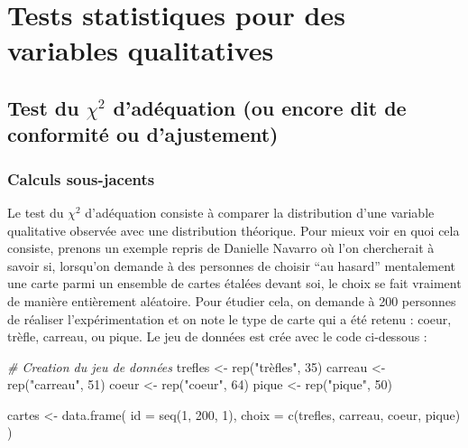 \documentclass[
]{book}
\newenvironment{Shaded}{\begin{snugshade}}{\end{snugshade}}
\newcommand{\AttributeTok}[1]{\textcolor[rgb]{0.77,0.63,0.00}{#1}}
\newcommand{\CommentTok}[1]{\textcolor[rgb]{0.56,0.35,0.01}{\textit{#1}}}
\newcommand{\DecValTok}[1]{\textcolor[rgb]{0.00,0.00,0.81}{#1}}
\newcommand{\FunctionTok}[1]{\textcolor[rgb]{0.00,0.00,0.00}{#1}}
\newcommand{\NormalTok}[1]{#1}
\newcommand{\OtherTok}[1]{\textcolor[rgb]{0.56,0.35,0.01}{#1}}
\newcommand{\StringTok}[1]{\textcolor[rgb]{0.31,0.60,0.02}{#1}}
\begin{document}
\hypertarget{tests-statistiques-pour-des-variables-qualitatives}{%
\chapter{Tests statistiques pour des variables qualitatives}\label{tests-statistiques-pour-des-variables-qualitatives}}

\hypertarget{test-du-chi2-daduxe9quation-ou-encore-dit-de-conformituxe9-ou-dajustement}{%
\section{\texorpdfstring{Test du \(\chi^2\) d'adéquation (ou encore dit de conformité ou d'ajustement)}{Test du \textbackslash chi\^{}2 d'adéquation (ou encore dit de conformité ou d'ajustement)}}\label{test-du-chi2-daduxe9quation-ou-encore-dit-de-conformituxe9-ou-dajustement}}

\hypertarget{calculs-sous-jacents}{%
\subsection{Calculs sous-jacents}\label{calculs-sous-jacents}}

Le test du \(\chi^2\) d'adéquation consiste à comparer la distribution d'une variable qualitative observée avec une distribution théorique. Pour mieux voir en quoi cela consiste, prenons un exemple repris de Danielle Navarro \autocite*{navarroLearningStatistics2018} où l'on chercherait à savoir si, lorsqu'on demande à des personnes de choisir ``au hasard'' mentalement une carte parmi un ensemble de cartes étalées devant soi, le choix se fait vraiment de manière entièrement aléatoire. Pour étudier cela, on demande à 200 personnes de réaliser l'expérimentation et on note le type de carte qui a été retenu : coeur, trèfle, carreau, ou pique. Le jeu de données est crée avec le code ci-dessous :

\begin{Shaded}
\begin{Highlighting}[]
\CommentTok{\# Creation du jeu de données}
\NormalTok{trefles }\OtherTok{\textless{}{-}} \FunctionTok{rep}\NormalTok{(}\StringTok{"trèfles"}\NormalTok{, }\DecValTok{35}\NormalTok{)}
\NormalTok{carreau }\OtherTok{\textless{}{-}} \FunctionTok{rep}\NormalTok{(}\StringTok{"carreau"}\NormalTok{, }\DecValTok{51}\NormalTok{)}
\NormalTok{coeur }\OtherTok{\textless{}{-}} \FunctionTok{rep}\NormalTok{(}\StringTok{"coeur"}\NormalTok{, }\DecValTok{64}\NormalTok{)}
\NormalTok{pique }\OtherTok{\textless{}{-}} \FunctionTok{rep}\NormalTok{(}\StringTok{"pique"}\NormalTok{, }\DecValTok{50}\NormalTok{)}

\NormalTok{cartes }\OtherTok{\textless{}{-}} \FunctionTok{data.frame}\NormalTok{(}
  \AttributeTok{id =} \FunctionTok{seq}\NormalTok{(}\DecValTok{1}\NormalTok{, }\DecValTok{200}\NormalTok{, }\DecValTok{1}\NormalTok{), }
  \AttributeTok{choix =} \FunctionTok{c}\NormalTok{(trefles, carreau, coeur, pique)}
\NormalTok{  )}
\end{Highlighting}
\end{Shaded}
\end{document}
